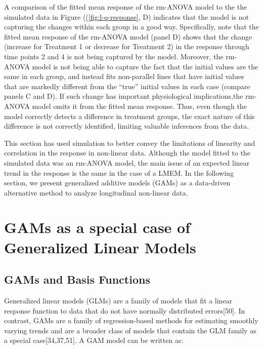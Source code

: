\documentclass[
]{article}
\begin{document}
A comparison of the fitted mean response of the rm-ANOVA model to the the simulated data in Figure ((\ref{fig:l-q-response}, D) indicates that the model is not capturing the changes within each group in a good way. Specifically, note that the fitted mean response of the rm-ANOVA model (panel D) shows that the change (increase for Treatment 1 or decrease for Treatment 2) in the response through time points 2 and 4 is not being captured by the model. Moreover, the rm-ANOVA model is not being able to capture the fact that the initial values are the same in each group, and instead fits non-parallel lines that have initial values that are markedly different from the ``true'' initial values in each case (compare panels C and D). If such change has important physiological implications,the rm-ANOVA model omits it from the fitted mean response. Thus, even though the model correctly detects a difference in treatment groups, the exact nature of this difference is not correctly identified, limiting valuable inferences from the data.

This section has used simulation to better convey the limitations of linearity and correlation in the response in non-linear data. Although the model fitted to the simulated data was an rm-ANOVA model, the main issue of an expected linear trend in the response is the same in the case of a LMEM. In the following section, we present generalized additive models (GAMs) as a data-driven alternative method to analyze longitudinal non-linear data.

\FloatBarrier

\hypertarget{gams-as-a-special-case-of-generalized-linear-models}{%
\section{GAMs as a special case of Generalized Linear Models}\label{gams-as-a-special-case-of-generalized-linear-models}}

\hypertarget{gams-and-basis-functions}{%
\subsection{GAMs and Basis Functions}\label{gams-and-basis-functions}}

Generalized linear models (GLMs) are a family of models that fit a linear response function to data that do not have normally distributed errors{[}50{]}. In contrast, GAMs are a family of regression-based methods for estimating smoothly varying trends and are a broader class of models that contain the GLM family as a special case{[}34,37,51{]}. A GAM model can be written as:
\end{document}
